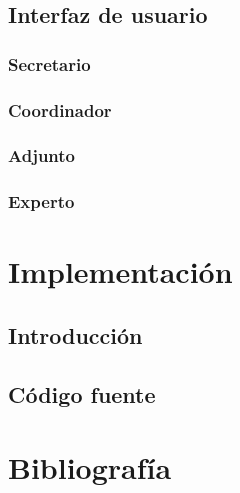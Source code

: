 \documentclass[a4paper,12pt,spanish,twoside]{article}
\begin{document}
\subsection{Interfaz de usuario}
\subsubsection{Secretario}
\subsubsection{Coordinador}
\subsubsection{Adjunto}
\subsubsection{Experto}

\section{Implementación}
\subsection{Introducción}
\subsection{Código fuente}

\section{Bibliografía}
\end{document}
